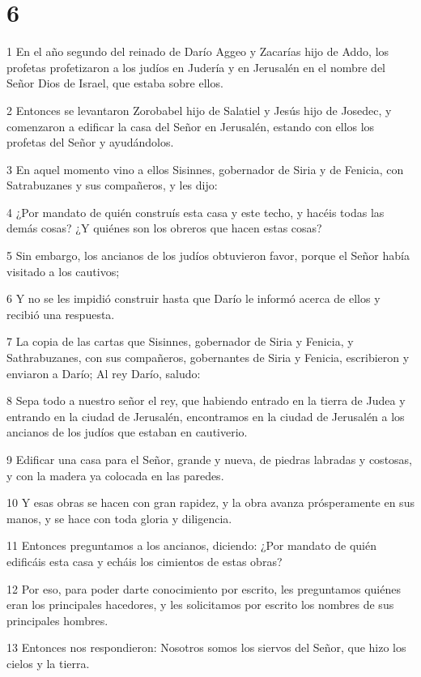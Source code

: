 \chapter{6}

\par 1 En el año segundo del reinado de Darío Aggeo y Zacarías hijo de Addo, los profetas profetizaron a los judíos en Judería y en Jerusalén en el nombre del Señor Dios de Israel, que estaba sobre ellos.
\par 2 Entonces se levantaron Zorobabel hijo de Salatiel y Jesús hijo de Josedec, y comenzaron a edificar la casa del Señor en Jerusalén, estando con ellos los profetas del Señor y ayudándolos.
\par 3 En aquel momento vino a ellos Sisinnes, gobernador de Siria y de Fenicia, con Satrabuzanes y sus compañeros, y les dijo:
\par 4 ¿Por mandato de quién construís esta casa y este techo, y hacéis todas las demás cosas? ¿Y quiénes son los obreros que hacen estas cosas?
\par 5 Sin embargo, los ancianos de los judíos obtuvieron favor, porque el Señor había visitado a los cautivos;
\par 6 Y no se les impidió construir hasta que Darío le informó acerca de ellos y recibió una respuesta.
\par 7 La copia de las cartas que Sisinnes, gobernador de Siria y Fenicia, y Sathrabuzanes, con sus compañeros, gobernantes de Siria y Fenicia, escribieron y enviaron a Darío; Al rey Darío, saludo:
\par 8 Sepa todo a nuestro señor el rey, que habiendo entrado en la tierra de Judea y entrando en la ciudad de Jerusalén, encontramos en la ciudad de Jerusalén a los ancianos de los judíos que estaban en cautiverio.
\par 9 Edificar una casa para el Señor, grande y nueva, de piedras labradas y costosas, y con la madera ya colocada en las paredes.
\par 10 Y esas obras se hacen con gran rapidez, y la obra avanza prósperamente en sus manos, y se hace con toda gloria y diligencia.
\par 11 Entonces preguntamos a los ancianos, diciendo: ¿Por mandato de quién edificáis esta casa y echáis los cimientos de estas obras?
\par 12 Por eso, para poder darte conocimiento por escrito, les preguntamos quiénes eran los principales hacedores, y les solicitamos por escrito los nombres de sus principales hombres.
\par 13 Entonces nos respondieron: Nosotros somos los siervos del Señor, que hizo los cielos y la tierra.
